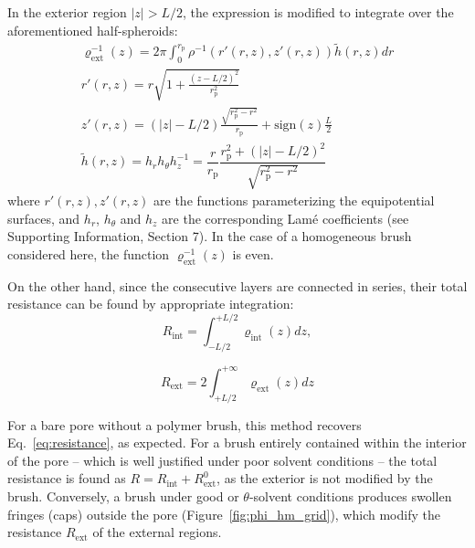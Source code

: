 \documentclass[12pt, a4paper]{article}
\begin{document}
In the exterior region $|z| >L/2$, the expression is modified to integrate over the aforementioned half-spheroids:
\begin{equation}
    \begin{gathered}
        \varrho_{\text{ext}}^{-1}(z)= 2\pi\int_{0}^{r_{\text{p}}^{}} \rho^{-1}\left( r'(r,z), z'(r,z) \right)  \tilde{h} (r,z) dr\\
        r'(r,z) = r\sqrt{1 + \frac{(z - L/2)^2}{r_{\text{p}}^2}}\\
        z'(r,z) = (|z| - L/2) \frac{\sqrt{r_{\text{p}}^2 - r^2}}{r_{\text{p}}} +  \text{sign}(z) \frac{L}{2}\\
        \tilde{h} (r,z) = h_r h_{\theta} h_z^{-1} = \dfrac{r}{r_{\text{p}}}\dfrac{r_{\text{p}}^2 + (|z|-L/2)^2}{\sqrt{r_{\text{p}}^2 - r^2}}
    \end{gathered}
\label{eq:varrho2}
\end{equation}
where $r'(r,z) , z'(r,z)$ are the functions parameterizing the equipotential surfaces, and $h_r$, $h_{\theta}$ and $h_z$ are the corresponding Lam\'e coefficients (see Supporting Information, Section 7). In the case of a homogeneous brush considered here, the function $\varrho_{\text{ext}}^{-1}(z)$ is even.%

On the other hand, since the consecutive layers are connected in series, their total resistance can be found by appropriate integration:
\begin{equation}
    R_{\text{int}} = \int_{-L/2}^{+L/2}\varrho_{\text{int}}(z) dz,
    \label{R_int}
\end{equation}

\begin{equation}
   R_{\text{ext}} =2\int_{+L/2}^{+\infty}\varrho_{\text{ext}}(z)dz
    \label{R_ext}
\end{equation}

For a bare pore without a polymer brush, this method recovers Eq.~\ref{eq:resistance}, as expected.
For a brush entirely contained within the interior of the pore -- which is well justified under poor solvent conditions -- the total resistance is found as $R = R_{\text{int}} + R_{\text{ext}}^{0}$, as the exterior is not modified by the brush.
Conversely, a brush under good or $\theta$-solvent conditions produces swollen fringes (caps) outside the pore (Figure~\ref{fig:phi_hm_grid}), which modify the resistance $R_{\text{ext}}$ of the external regions.
\end{document}
